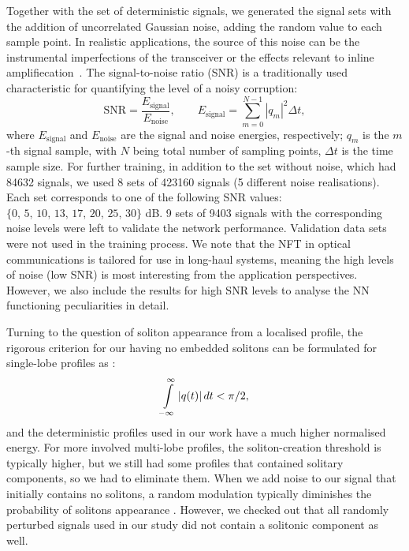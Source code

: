 Together with the set of deterministic signals, we generated the signal sets with the addition of uncorrelated Gaussian noise, adding the random value to each sample point. In realistic applications, the source of this noise can be the instrumental imperfections of the transceiver or the effects relevant to inline amplifiecation~\cite{a12}. The signal-to-noise ratio (SNR) is a traditionally used characteristic for quantifying  the level of a noisy corruption: 
\begin{equation}
    \text{SNR} = \frac{E_{\text{signal}}}{E_{\text{noise}}} {,} \qquad
    E_{\text{signal}} = \sum_{m = 0}^{N - 1} |q_m|^2 \Delta t {,}
    \label{eq:snr}
\end{equation}
where $E_{\text{signal}}$ and $E_{\text{noise}}$ are the signal and noise energies, respectively; $q_m$ is the $m$-th signal sample, with $N$ being total number of sampling points, $\Delta t$ is the time sample size. For further training, in addition to the set without noise, which had 84632 signals, we used 8 sets of 423160 signals (5 different noise realisations). Each set corresponds to one of the following SNR values: $\{0, \, 5, \,10, \, 13, \, 17, \, 20, \, 25, \, 30\}$ dB. 
9 sets of 9403 signals with the corresponding noise levels were left to validate the network performance. Validation data sets were not used in the training process. 
We note that the NFT in optical communications is tailored for use in long-haul systems, meaning the high levels of noise (low SNR) is most interesting from the application perspectives. However, we also include the results for high SNR levels to analyse the NN functioning peculiarities in detail.


Turning to the question of soliton appearance from a localised profile, the rigorous criterion for our having no embedded solitons can be formulated for single-lobe profiles as \cite{ks03}:
\begin{equation}\label{l1}
\intop_{-\infty}^{\infty} |q(t)| \, dt < \pi/2,
\end{equation}
and the deterministic profiles used in our work have a much higher normalised energy. For more involved multi-lobe profiles, the soliton-creation threshold is typically higher, but we still had some profiles that contained solitary components, so we had to eliminate them. When we add noise to our signal that initially contains no solitons, a random modulation typically diminishes the probability of solitons appearance \cite{td08,dp08}. However, we checked out that all randomly perturbed signals used in our study did not contain a solitonic component as well.



